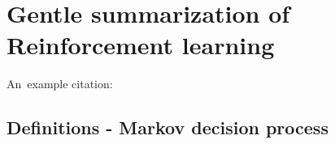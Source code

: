 \chapter{Gentle summarization of Reinforcement learning}

An~example citation: \cite{Andel07}

\section{Definitions - Markov decision process}
